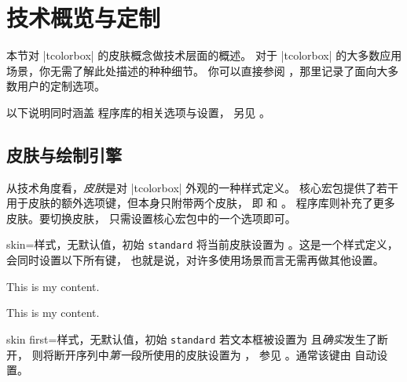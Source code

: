 \clearpage
\section{技术概览与定制}\label{sec:technical}%
%
本节对 |tcolorbox| 的皮肤概念做技术层面的概述。
对于 |tcolorbox| 的大多数应用场景，你无需了解此处描述的种种细节。
你可以直接参阅 ，那里记录了面向大多数用户的定制选项。

以下说明同时涵盖  程序库的相关选项与设置，
另见 。

\subsection{皮肤与绘制引擎}\label{sec:skincorekeys}
从技术角度看，\emph{皮肤}是对 |tcolorbox| 外观的一种样式定义。
核心宏包提供了若干用于皮肤的额外选项键，但本身只附带两个皮肤，
即  和 。
 程序库则补充了更多皮肤。要切换皮肤，
只需设置核心宏包中的一个选项即可。

\begin{docTcbKey}{skin}{=}{样式，无默认值，初始 \texttt{standard}}
  将当前皮肤设置为 。这是一个样式定义，会同时设置以下所有键，
  也就是说，对许多使用场景而言无需再做其他设置。
\begin{dispExample}

\begin{tcolorbox}[adjusted title=My title]
  This is my content.
\end{tcolorbox}
\begin{tcolorbox}[beamer,adjusted title=My title]
  This is my content.
\end{tcolorbox}
\end{dispExample}
\end{docTcbKey}

\begin{docTcbKey}{skin first}{=}{样式，无默认值，初始 \texttt{standard}}
  若文本框被设置为  且\emph{确实}发生了断开，
  则将断开序列中\emph{第一}段所使用的皮肤设置为 ，
  参见 。通常该键由  自动设置。
\end{docTcbKey}



